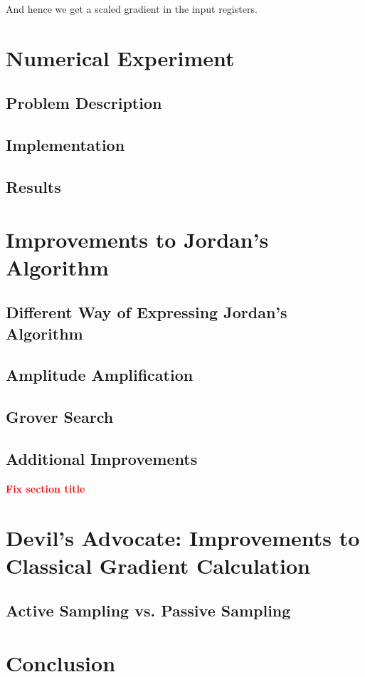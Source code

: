 \documentclass{article}
\begin{document}
And hence we get a scaled gradient in the input registers.

\section{Numerical Experiment}
\subsection{Problem Description}
\subsection{Implementation}
\subsection{Results}

\section{Improvements to Jordan's Algorithm}
\subsection{Different Way of Expressing Jordan's Algorithm}
\subsection{Amplitude Amplification}
\subsection{Grover Search}
\subsection{Additional Improvements}
\textbf{\textcolor{red}{Fix section title}}

\section{Devil's Advocate: Improvements to Classical Gradient Calculation}
\subsection{Active Sampling vs. Passive Sampling}

\section{Conclusion}
\printbibliography
\end{document}
